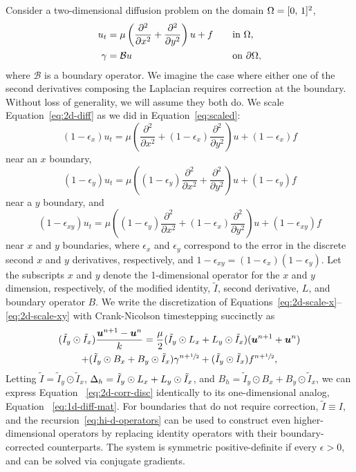 Consider a two-dimensional diffusion problem on the domain $\Omega = [0,\,1]^2$,
\begin{alignat}{2}
    u_t      &= \mu\left(\frac{\partial^2}{\partial x^2} + \frac{\partial^2}{\partial y^2}\right) u + f     &&\quad \text{in} \ \domain, \label{eq:2d-diff} \\
    \gamma   &= \mathcal{B}u             &&\quad \text{on} \ \partial\domain \label{eq:2d-bdy},
\end{alignat}
where $\mathcal{B}$ is a boundary operator.  We imagine the case where either one of the
second derivatives composing the Laplacian requires correction at the boundary. Without
loss of generality, we will assume they both do. We scale Equation~\eqref{eq:2d-diff} as
we did in Equation~\eqref{eq:scaled}:
\begin{equation}\label{eq:2d-scale-x}
    (1-\epsilon_x) u_t = \mu\left(\frac{\partial^2}{\partial x^2} + (1-\epsilon_x)\frac{\partial^2}{\partial y^2}\right) u + (1-\epsilon_x) f
\end{equation}
near an $x$ boundary,
\begin{equation}\label{eq:2d-scale-y}
    (1-\epsilon_y) u_t = \mu\left((1-\epsilon_y)\frac{\partial^2}{\partial x^2} + \frac{\partial^2}{\partial y^2}\right) u + (1-\epsilon_y) f
\end{equation}
near a $y$ boundary, and
\begin{equation}\label{eq:2d-scale-xy}
    (1-\epsilon_{xy}) u_t = \mu\left((1-\epsilon_y)\frac{\partial^2}{\partial x^2} + (1-\epsilon_x)\frac{\partial^2}{\partial y^2}\right) u + (1-\epsilon_{xy}) f
\end{equation}
near $x$ and $y$ boundaries, where $\epsilon_x$ and $\epsilon_y$ correspond to the error
in the discrete second $x$ and $y$ derivatives, respectively, and
$1-\epsilon_{xy} = (1-\epsilon_x)(1-\epsilon_y)$. Let the subscripts $x$ and $y$ denote
the 1-dimensional operator for the $x$ and $y$ dimension, respectively, of the modified
identity, $\tilde{I}$, second derivative, $L$, and boundary operator $B$. We write the
discretization of Equations~\eqref{eq:2d-scale-x}--\eqref{eq:2d-scale-xy} with
Crank-Nicolson timestepping succinctly as
\begin{multline}\label{eq:2d-corr-disc}
    (\tilde{I}_y \odot \tilde{I}_x) \frac{\boldsymbol{u}^{n+1} - \boldsymbol{u}^n}{k} =
    \frac{\mu}{2}(\tilde{I}_y \odot L_x + L_y \odot \tilde{I}_x)(\boldsymbol{u}^{n+1} + \boldsymbol{u}^n) \\
    +(\tilde{I}_y \odot B_x + B_y \odot \tilde{I}_x)\gamma^{n+\sfrac12} + (\tilde{I}_y \odot \tilde{I}_x) f^{n+\sfrac12},
\end{multline}
Letting $\tilde{I} = \tilde{I}_y \odot \tilde{I}_x$,
$\Delta_h = \tilde{I}_y \odot L_x + L_y \odot \tilde{I}_x$, and
$B_h = \tilde{I}_y \odot B_x + B_y \odot \tilde{I}_x$, we can express Equation~%
\eqref{eq:2d-corr-disc} identically to its one-dimensional analog, Equation~%
\eqref{eq:1d-diff-mat}. For boundaries that do not require correction,
$\tilde{I}\equiv I$, and the recursion~\eqref{eq:hi-d-operators} can be used to construct
even higher-dimensional operators by replacing identity operators with their
boundary-corrected counterparts. The system is symmetric positive-definite if every
$\epsilon > 0$, and can be solved via conjugate gradients.

